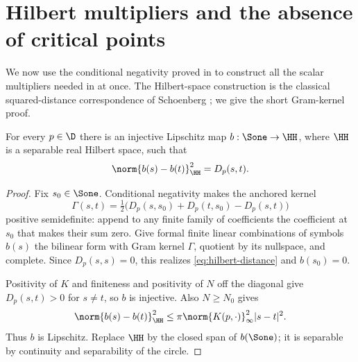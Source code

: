 \section{Hilbert multipliers and the absence of critical points}\label{sec:conclusion}

We now use the conditional negativity proved in  to construct all the scalar multipliers needed in  at once. The Hilbert-space construction is the classical squared-distance correspondence of Schoenberg \cite{Schoenberg1938}; we give the short Gram-kernel proof.

\begin{lemma}\label{lem:hilbert}
For every $p\in\D$ there is an injective Lipschitz map $b:\Sone\to\HH$, where $\HH$ is a separable real Hilbert space, such that
\begin{equation}\label{eq:hilbert-distance}
\norm{b(s)-b(t)}_\HH^2=D_p(s,t).
\end{equation}
\end{lemma}
\begin{proof}
Fix $s_0\in\Sone$. Conditional negativity makes the anchored kernel
\[
\Gamma(s,t)=\tfrac12\bigl(D_p(s,s_0)+D_p(t,s_0)-D_p(s,t)\bigr)
\]
positive semidefinite: append to any finite family of coefficients the coefficient at $s_0$ that makes their sum zero. Give formal finite linear combinations of symbols $b(s)$ the bilinear form with Gram kernel $\Gamma$, quotient by its nullspace, and complete. Since $D_p(s,s)=0$, this realizes \eqref{eq:hilbert-distance} and $b(s_0)=0$.

Positivity of $K$ and finiteness and positivity of $N$ off the diagonal give $D_p(s,t)>0$ for $s\ne t$, so $b$ is injective. Also $N\ge N_0$ gives
\[
\norm{b(s)-b(t)}_\HH^2
\le\pi\norm{K(p,\cdot)}_\infty^2|s-t|^2.
\]
Thus $b$ is Lipschitz. Replace $\HH$ by the closed span of $b(\Sone)$; it is separable by continuity and separability of the circle.
\end{proof}

